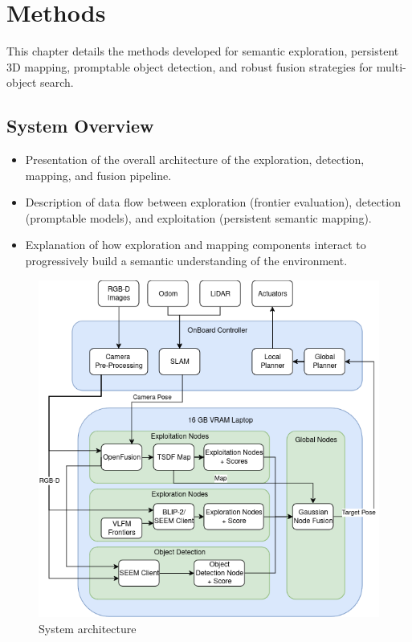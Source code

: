 \chapter{Methods}
This chapter details the methods developed for semantic exploration, persistent 3D mapping, promptable object detection, and robust fusion strategies for multi-object search. 

\section{System Overview}
\begin{itemize}
    \item Presentation of the overall architecture of the exploration, detection, mapping, and fusion pipeline.
    \item Description of data flow between exploration (frontier evaluation), detection (promptable models), and exploitation (persistent semantic mapping).
    \item Explanation of how exploration and mapping components interact to progressively build a semantic understanding of the environment.
\end{itemize}

\begin{figure}[h!]
    \centering
    \includegraphics[width=\textwidth]{Images/03_methods/Master_Thesis_Overview.drawio.png}
    \caption{System architecture}
    \label{fig:system_overview}
\end{figure}


